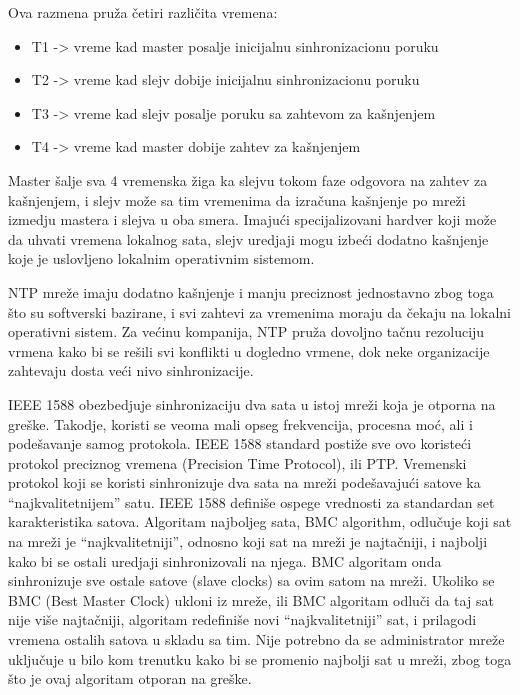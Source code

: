 \documentclass[a4paper,12pt, master]{etf}
\begin{document}
	Ova razmena pru\v{z}a \v{c}etiri razli\v{c}ita vremena:
	\begin{itemize}
		\item T1 -> vreme kad master posalje inicijalnu sinhronizacionu poruku
		\item T2 -> vreme kad slejv dobije inicijalnu sinhronizacionu poruku
		\item T3 -> vreme kad slejv posalje poruku sa zahtevom za ka\v{s}njenjem
		\item T4 -> vreme kad master dobije zahtev za ka\v{s}njenjem
	\end{itemize}

	Master \v{s}alje sva 4 vremenska \v{z}iga ka slejvu tokom faze odgovora na
	zahtev za ka\v{s}njenjem, i slejv mo\v{z}e sa tim vremenima da izra\v{c}una
	ka\v{s}njenje po mre\v{z}i izmedju mastera i slejva u oba smera.
	Imaju\'{c}i specijalizovani hardver koji mo\v{z}e da uhvati vremena
	lokalnog sata, slejv uredjaji mogu izbe\'{c}i dodatno ka\v{s}njenje koje je
	uslovljeno lokalnim operativnim	sistemom.

	NTP mre\v{z}e imaju dodatno ka\v{s}njenje i manju preciznost jednostavno
	zbog toga \v{s}to su softverski bazirane, i svi zahtevi za vremenima moraju
	da \v{c}ekaju na lokalni operativni	sistem. Za ve\'{c}inu kompanija, NTP
	pru\v{z}a dovoljno ta\v{c}nu rezoluciju vrmena kako bi se re\v{s}ili
	svi konflikti u dogledno vrmene, dok neke organizacije zahtevaju dosta
	ve\'{c}i nivo sinhronizacije.

	IEEE 1588 obezbedjuje sinhronizaciju dva sata u istoj mre\v{z}i koja je
	otporna na gre\v{s}ke. Takodje, koristi se veoma mali opseg frekvencija,
	procesna mo\'{c}, ali i pode\v{s}avanje samog protokola. IEEE 1588 standard
	posti\v{z}e sve ovo koriste\'{c}i protokol preciznog vremena (Precision
	Time Protocol), ili PTP\@. Vremenski protokol koji se koristi sinhronizuje
	dva sata na	mre\v{z}i pode\v{s}avaju\'{c}i satove ka ``najkvalitetnijem''
	satu. IEEE 1588	defini\v{s}e ospege vrednosti za standardan set
	karakteristika satova. Algoritam najboljeg sata, BMC algorithm,
	odlu\v{c}uje koji sat na mre\v{z}i je ``najkvalitetniji'', odnosno koji sat
	na mre\v{z}i je najta\v{c}niji, i najbolji kako bi se ostali uredjaji
	sinhronizovali na njega. BMC algoritam onda sinhronizuje sve ostale satove
	(slave clocks) sa ovim satom na mre\v{z}i.	Ukoliko se BMC (Best Master
	Clock) ukloni iz mre\v{z}e, ili BMC algoritam odlu\v{c}i da taj sat
	nije vi\v{s}e najta\v{c}niji, algoritam redefini\v{s}e novi
	``najkvalitetniji'' sat, i prilagodi vremena ostalih satova u skladu sa
	tim. Nije potrebno da se administrator mre\v{z}e uklju\v{c}uje u bilo kom
	trenutku kako bi se promenio najbolji sat u mre\v{z}i, zbog toga \v{s}to je
	ovaj algoritam otporan na gre\v{s}ke.
\end{document}
